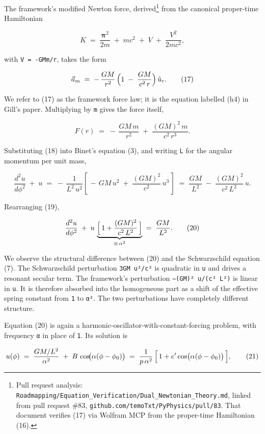\documentclass[
  11pt,
]{article}
\begin{document}
The framework's modified Newton force, derived\footnote{Pull request
  analysis:
  \texttt{Roadmapping/Equation\_Verification/Dual\_Newtonian\_Theory.md},
  linked from pull request \#83,
  \texttt{github.com/temoTxt/PyPhysics/pull/83}. That document verifies
  (17) via Wolfram MCP from the proper-time Hamiltonian (16).} from the
canonical proper-time Hamiltonian

\[
K \;=\; \frac{\boldsymbol\pi^{2}}{2m} \;+\; m c^{2} \;+\; V \;+\; \frac{V^{2}}{2 m c^{2}}, \tag{16}
\]

with \texttt{V\ =\ -GMm/r}, takes the form

\[
\vec{a}_{m}
\;=\; -\,\frac{GM}{r^{2}}\,\Bigl(1 \;-\; \frac{GM}{c^{2}\,r}\Bigr)\,\hat{u}_{r}. \tag{17}
\]

We refer to (17) as the framework force law; it is the equation labelled
(h4) in Gill's paper. Multiplying by \texttt{m} gives the force itself,

\[
F(r) \;=\; -\,\frac{GM\,m}{r^{2}} \;+\; \frac{(GM)^{2}\,m}{c^{2}\,r^{3}}. \tag{18}
\]

Substituting (18) into Binet's equation (3), and writing \texttt{L} for
the angular momentum per unit mass,

\[
\frac{d^{2} u}{d\phi^{2}} \;+\; u
\;=\; -\,\frac{1}{L^{2}\,u^{2}}\!\left[\,-\,GM\,u^{2} \;+\; \frac{(GM)^{2}}{c^{2}}\,u^{3}\,\right]
\;=\; \frac{GM}{L^{2}} \;-\; \frac{(GM)^{2}}{c^{2}\,L^{2}}\,u. \tag{19}
\]

Rearranging (19),

\[
\frac{d^{2} u}{d\phi^{2}}
\;+\; u\,\underbrace{\Bigl[\,1 + \frac{(GM)^{2}}{c^{2}\,L^{2}}\,\Bigr]}_{\equiv\,\alpha^{2}}
\;=\; \frac{GM}{L^{2}}. \tag{20}
\]

We observe the structural difference between (20) and the Schwarzschild
equation (7). The Schwarzschild perturbation \texttt{3GM\ u²/c²} is
quadratic in \texttt{u} and drives a resonant secular term. The
framework's perturbation \texttt{−(GM)²\ u/(c²\ L²)} is linear in
\texttt{u}. It is therefore absorbed into the homogeneous part as a
shift of the effective spring constant from \texttt{1} to \texttt{α²}.
The two perturbations have completely different structure.

Equation (20) is again a harmonic-oscillator-with-constant-forcing
problem, with frequency \texttt{α} in place of \texttt{1}. Its solution
is

\[
u(\phi) \;=\; \frac{GM/L^{2}}{\alpha^{2}} \;+\; B\,\cos\!\bigl(\alpha(\phi - \phi_{0})\bigr)
\;=\; \frac{1}{p\,\alpha^{2}}\,\Bigl[\,1 + e'\cos\bigl(\alpha(\phi - \phi_{0})\bigr)\,\Bigr], \tag{21}
\]
\end{document}

